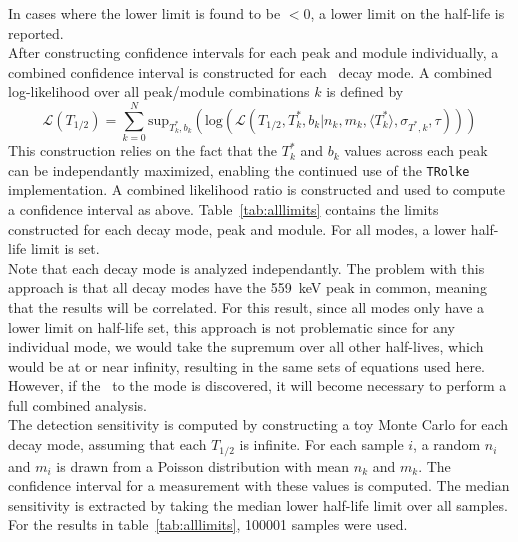 \documentclass[/main.tex]{subfiles}
\begin{document}
In cases where the lower limit is found to be $<0$, a lower limit on the half-life is reported.
\\
After constructing confidence intervals for each peak and module individually, a combined confidence interval is constructed for each \bbes\ decay mode.
A combined log-likelihood over all peak/module combinations $k$ is defined by
\begin{equation}
  \mathcal{L}(T_{1/2}) = \sum_{k=0}^{N} \mathrm{sup}_{T^*_k,b_k}(\mathrm{log}(\mathcal{L}(T_{1/2},T^*_k,b_k|n_k,m_k,\langle T^*_k\rangle, \sigma_{T^*,k},\tau)))
\end{equation}
This construction relies on the fact that the $T^*_k$ and $b_k$ values across each peak can be independantly maximized, enabling the continued use of the \texttt{TRolke} implementation.
A combined likelihood ratio is constructed and used to compute a confidence interval as above.
Table~\ref{tab:alllimits} contains the limits constructed for each decay mode, peak and module.
For all modes, a lower half-life limit is set.
\\
Note that each decay mode is analyzed independantly.
The problem with this approach is that all decay modes have the 559~keV peak in common, meaning that the results will be correlated.
For this result, since all modes only have a lower limit on half-life set, this approach is not problematic since for any individual mode, we would take the supremum over all other half-lives, which would be at or near infinity, resulting in the same sets of equations used here.
However, if the \bbes\ to the  mode is discovered, it will become necessary to perform a full combined analysis.
\\
The detection sensitivity is computed by constructing a toy Monte Carlo for each decay mode, assuming that each $T_{1/2}$ is infinite.
For each sample $i$, a random $n_i$ and $m_i$ is drawn from a Poisson distribution with mean $n_k$ and $m_k$.
The confidence interval for a measurement with these values is computed.
The median sensitivity is extracted by taking the median lower half-life limit over all samples.
For the results in table~\ref{tab:alllimits}, 100001 samples were used.
\\
\end{document}
